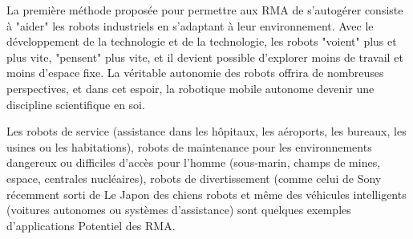 La première méthode proposée pour permettre aux RMA de s'autogérer consiste à "aider" les robots industriels en s'adaptant à leur environnement. Avec le développement de la technologie et de la technologie, les robots "voient" plus et plus vite, "pensent" plus vite, et il devient possible d'explorer moins de travail et moins d'espace fixe. La véritable autonomie des robots offrira de nombreuses perspectives, et dans cet espoir, la robotique mobile autonome devenir une discipline scientifique en soi.

Les robots de service (assistance dans les hôpitaux, les aéroports, les bureaux, les usines ou les habitations), robots de maintenance pour les environnements dangereux ou difficiles d'accès pour l'homme (sous-marin, champs de mines, espace, centrales nucléaires), robots de divertissement (comme celui de Sony récemment sorti de Le Japon des chiens robots et même des véhicules intelligents (voitures autonomes ou systèmes d'assistance) sont quelques exemples d'applications Potentiel des RMA.